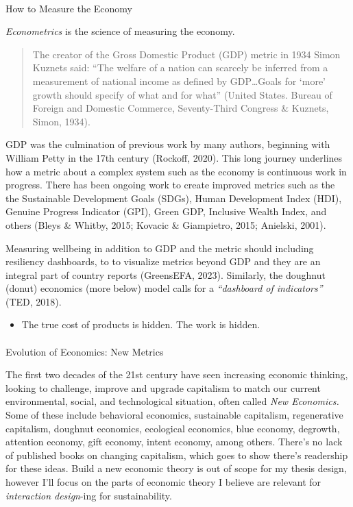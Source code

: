 \documentclass[
  letterpaper,
  DIV=11,
  numbers=noendperiod]{scrartcl}
\makeatletter
\let\oldparagraph\paragraph
\renewcommand{\paragraph}{
    \@ifstar
      \xxxParagraphStar
      \xxxParagraphNoStar
  }
\newcommand{\xxxParagraphStar}[1]{\oldparagraph*{#1}\mbox{}}
\newcommand{\xxxParagraphNoStar}[1]{\oldparagraph{#1}\mbox{}}
\providecommand{\tightlist}{%
  \setlength{\itemsep}{0pt}\setlength{\parskip}{0pt}}\usepackage{longtable,booktabs,array}
\makeatother
\begin{document}
\paragraph{How to Measure the Economy}\label{how-to-measure-the-economy}

\emph{Econometrics} is the science of measuring the economy.

\begin{quote}
The creator of the Gross Domestic Product (GDP) metric in 1934 Simon
Kuznets said: ``The welfare of a nation can scarcely be inferred from a
measurement of national income as defined by GDP\ldots Goals for `more'
growth should specify of what and for what'' (United States. Bureau of
Foreign and Domestic Commerce, Seventy-Third Congress \& Kuznets, Simon,
1934).
\end{quote}

GDP was the culmination of previous work by many authors, beginning with
William Petty in the 17th century (Rockoff, 2020). This long journey
underlines how a metric about a complex system such as the economy is
continuous work in progress. There has been ongoing work to create
improved metrics such as the the Sustainable Development Goals (SDGs),
Human Development Index (HDI), Genuine Progress Indicator (GPI), Green
GDP, Inclusive Wealth Index, and others (Bleys \& Whitby, 2015; Kovacic
\& Giampietro, 2015; Anielski, 2001).

Measuring wellbeing in addition to GDP and the metric should including
resiliency dashboards, to to visualize metrics beyond GDP and they are
an integral part of country reports (GreensEFA, 2023). Similarly, the
doughnut (donut) economics (more below) model calls for a
\emph{``dashboard of indicators''} (TED, 2018).

\begin{itemize}
\tightlist
\item
  The true cost of products is hidden. The work is hidden.
\end{itemize}

\paragraph{Evolution of Economics: New
Metrics}\label{evolution-of-economics-new-metrics}

The first two decades of the 21st century have seen increasing economic
thinking, looking to challenge, improve and upgrade capitalism to match
our current environmental, social, and technological situation, often
called \emph{New Economics.} Some of these include behavioral economics,
sustainable capitalism, regenerative capitalism, doughnut economics,
ecological economics, blue economy, degrowth, attention economy, gift
economy, intent economy, among others. There's no lack of published
books on changing capitalism, which goes to show there's readership for
these ideas. Build a new economic theory is out of scope for my thesis
design, however I'll focus on the parts of economic theory I believe are
relevant for \emph{interaction design}-ing for sustainability.
\end{document}
